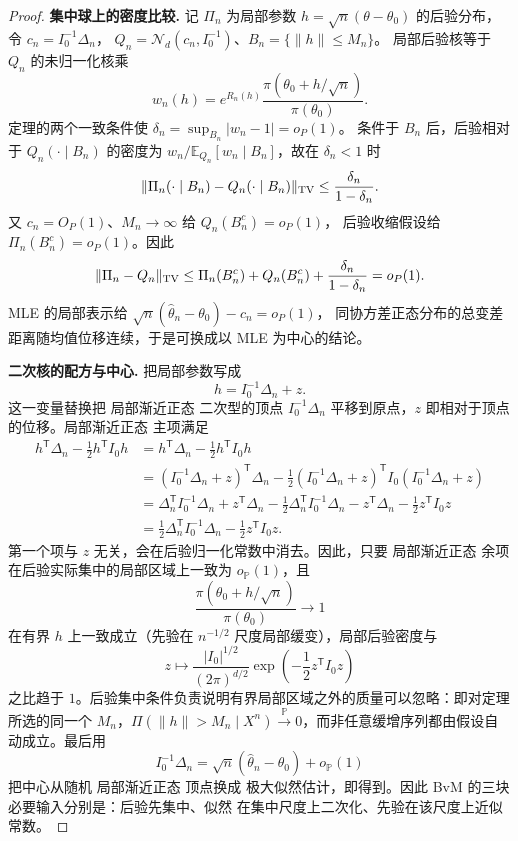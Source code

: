 \begin{proof}
\textbf{集中球上的密度比较.} 记 $\Pi_n$ 为局部参数 $h=\sqrt n(\theta-\theta_0)$ 的后验分布，令 $c_n=I_0^{-1}\Delta_n$，
$Q_n=\mathcal N_d(c_n,I_0^{-1})$、$B_n=\{\|h\|\le M_n\}$。
局部后验核等于 $Q_n$ 的未归一化核乘
\[
 w_n(h)=e^{R_n(h)}\frac{\pi(\theta_0+h/\sqrt n)}{\pi(\theta_0)}.
\]
定理的两个一致条件使 $\delta_n=\sup_{B_n}|w_n-1|=o_P(1)$。
条件于 $B_n$ 后，后验相对于 $Q_n(\cdot\mid B_n)$ 的密度为
$w_n/\mathbb E_{Q_n}[w_n\mid B_n]$，故在 $\delta_n<1$ 时
\[
 \|\Pi_n(\cdot\mid B_n)-Q_n(\cdot\mid B_n)\|_{\rm TV}
 \le\frac{\delta_n}{1-\delta_n}.
\]
又 $c_n=O_P(1)$、$M_n\to\infty$ 给 $Q_n(B_n^c)=o_P(1)$，
后验收缩假设给 $\Pi_n(B_n^c)=o_P(1)$。因此
\[
 \|\Pi_n-Q_n\|_{\rm TV}
 \le\Pi_n(B_n^c)+Q_n(B_n^c)+\frac{\delta_n}{1-\delta_n}=o_P(1).
\]
MLE 的局部表示给 $\sqrt n(\widehat\theta_n-\theta_0)-c_n=o_P(1)$，
同协方差正态分布的总变差距离随均值位移连续，于是可换成以 MLE 为中心的结论。

\textbf{二次核的配方与中心.} 把局部参数写成
\[
 h=I_0^{-1}\Delta_n+z.
\]
这一变量替换把 局部渐近正态 二次型的顶点 $I_0^{-1}\Delta_n$ 平移到原点，$z$ 即相对于顶点的位移。局部渐近正态 主项满足
\[
 \begin{aligned}
 h^{\mathsf T}\Delta_n-\frac12h^{\mathsf T}I_0h
 &=h^{\mathsf T}\Delta_n-\frac12h^{\mathsf T}I_0h\\
 &=(I_0^{-1}\Delta_n+z)^{\mathsf T}\Delta_n
   -\frac12(I_0^{-1}\Delta_n+z)^{\mathsf T}I_0(I_0^{-1}\Delta_n+z)\\
 &=\Delta_n^{\mathsf T}I_0^{-1}\Delta_n+z^{\mathsf T}\Delta_n
   -\frac12\Delta_n^{\mathsf T}I_0^{-1}\Delta_n
   -z^{\mathsf T}\Delta_n
   -\frac12z^{\mathsf T}I_0z\\
 &=\frac12\Delta_n^{\mathsf T}I_0^{-1}\Delta_n
   -\frac12z^{\mathsf T}I_0z.
 \end{aligned}
\]
第一个项与 $z$ 无关，会在后验归一化常数中消去。因此，只要 局部渐近正态 余项在后验实际集中的局部区域上一致为 $o_{\mathbb P}(1)$，且
\[
 \frac{\pi(\theta_0+h/\sqrt n)}{\pi(\theta_0)}\to1
\]
在有界 $h$ 上一致成立（先验在 $n^{-1/2}$ 尺度局部缓变），局部后验密度与
\[
 z\mapsto
 \frac{|I_0|^{1/2}}{(2\pi)^{d/2}}
 \exp\!\left(-\frac12z^{\mathsf T}I_0z\right)
\]
之比趋于 $1$。后验集中条件负责说明有界局部区域之外的质量可以忽略：即对定理所选的同一个 $M_n$，$\Pi(\|h\|>M_n\mid X^n)\xrightarrow{\mathbb P}0$，而非任意缓增序列都由假设自动成立。最后用
\[
 I_0^{-1}\Delta_n
 =\sqrt n(\widehat\theta_n-\theta_0)+o_{\mathbb P}(1)
\]
把中心从随机 局部渐近正态 顶点换成 极大似然估计，即得到。因此 BvM 的三块必要输入分别是：后验先集中、似然 在集中尺度上二次化、先验在该尺度上近似常数。
\end{proof}

